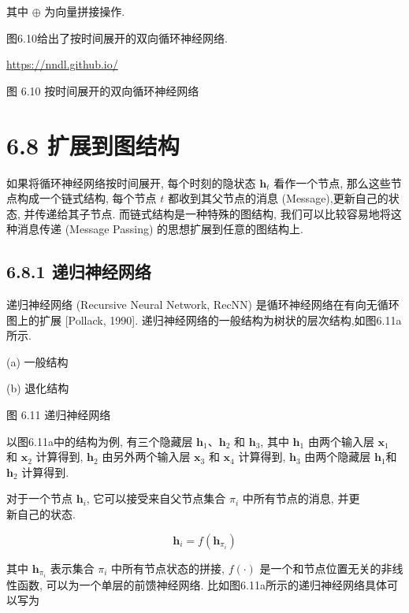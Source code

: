 \documentclass[10pt]{article}
\begin{document}
其中 $\oplus$ 为向量拼接操作.

图6.10给出了按时间展开的双向循环神经网络.

\href{https://nndl.github.io/}{https://nndl.github.io/}



图 6.10 按时间展开的双向循环神经网络

\section*{6.8 扩展到图结构}
如果将循环神经网络按时间展开, 每个时刻的隐状态 $\boldsymbol{h}_{t}$ 看作一个节点, 那么这些节点构成一个链式结构, 每个节点 $t$ 都收到其父节点的消息 (Message),更新自己的状态, 并传递给其子节点. 而链式结构是一种特殊的图结构, 我们可以比较容易地将这种消息传递 (Message Passing) 的思想扩展到任意的图结构上.

\subsection*{6.8.1 递归神经网络}
递归神经网络 (Recursive Neural Network, RecNN) 是循环神经网络在有向无循环图上的扩展 [Pollack, 1990]. 递归神经网络的一般结构为树状的层次结构,如图6.11a所示.



(a) 一般结构



(b) 退化结构

图 6.11 递归神经网络

以图6.11a中的结构为例, 有三个隐藏层 $\boldsymbol{h}_{1} 、 \boldsymbol{h}_{2}$ 和 $\boldsymbol{h}_{3}$, 其中 $\boldsymbol{h}_{1}$ 由两个输入层 $\boldsymbol{x}_{1}$ 和 $\boldsymbol{x}_{2}$ 计算得到, $\boldsymbol{h}_{2}$ 由另外两个输入层 $\boldsymbol{x}_{3}$ 和 $\boldsymbol{x}_{4}$ 计算得到, $\boldsymbol{h}_{3}$ 由两个隐藏层 $\boldsymbol{h}_{1}$和 $\boldsymbol{h}_{2}$ 计算得到.

对于一个节点 $\boldsymbol{h}_{i}$, 它可以接受来自父节点集合 $\pi_{i}$ 中所有节点的消息, 并更\\
新自己的状态.


\begin{equation*}
\boldsymbol{h}_{i}=f\left(\boldsymbol{h}_{\pi_{i}}\right) \tag{6.74}
\end{equation*}


其中 $\boldsymbol{h}_{\pi_{i}}$ 表示集合 $\pi_{i}$ 中所有节点状态的拼接, $f(\cdot)$ 是一个和节点位置无关的非线性函数, 可以为一个单层的前馈神经网络. 比如图6.11a所示的递归神经网络具体可以写为
\end{document}
